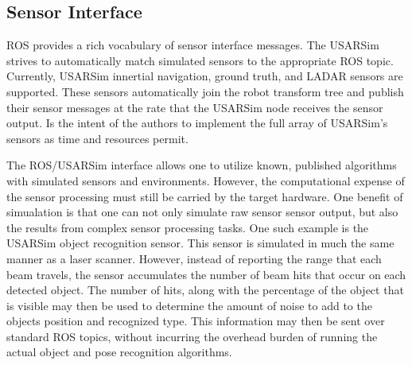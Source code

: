 \subsection*{Sensor Interface} 
ROS provides a rich vocabulary of sensor interface messages. The USARSim strives to automatically match simulated sensors to the appropriate ROS topic. Currently, USARSim innertial navigation, ground truth, and LADAR sensors are supported. These sensors automatically join the robot transform tree and publish their sensor messages at the rate that the USARSim node receives the sensor output. Is the intent of the authors to implement the full array of USARSim's sensors as time and resources permit.

The ROS/USARSim interface allows one to utilize known, published algorithms with simulated sensors and environments. However, the computational expense of the sensor processing must still be carried by the target hardware. One benefit of simualation is that one can not only simulate raw sensor sensor output, but also the results from complex sensor processing tasks. One such example is the USARSim object recognition sensor. This sensor  is simulated in much the same manner as a laser scanner. However, instead of reporting the range that each beam travels, the sensor accumulates the number of beam hits that occur on each detected object. The number of hits, along with the percentage of the object that is visible may then be used to determine the amount of noise to add to the objects position and recognized type. This information may then be sent over standard ROS topics, without incurring the overhead burden of running the actual object and pose recognition algorithms.